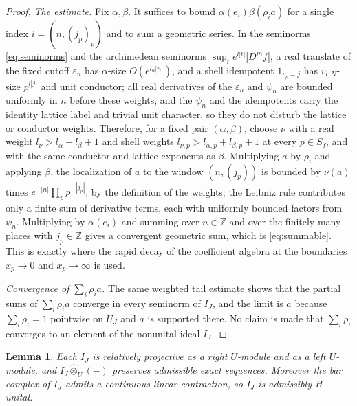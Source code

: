 \documentclass[11pt]{amsart}
\newtheorem{lemma}[theorem]{Lemma}
\theoremstyle{definition}
\theoremstyle{remark}
\newcommand{\Z}{\mathbb Z}
\begin{document}
\begin{proof}
\emph{The estimate.}  Fix $\alpha,\beta$.  It suffices to bound
$\alpha(e_i)\beta(\rho_ia)$ for a single index $i=(n,(j_p)_p)$ and to sum a
geometric series.  In the seminorms \eqref{eq:seminorms} and the archimedean
seminorms $\sup_te^{l|t|}|D^{m}f|$, a real translate of the fixed cutoff
$\varepsilon_n$ has $\alpha$-size $O(e^{l_{\alpha}|n|})$, and a shell
idempotent $1_{v_p=j}$ has $v_{l,N}$-size $p^{l|j|}$ and unit conductor; all
real derivatives of the $\varepsilon_n$ and $\psi_n$ are bounded uniformly in
$n$ before these weights, and the $\psi_n$ and the idempotents carry the
identity lattice label and trivial unit character, so they do not disturb the
lattice or conductor weights.  Therefore, for a fixed pair $(\alpha,\beta)$,
choose $\nu$ with a real weight $l_{\nu}>l_{\alpha}+l_{\beta}+1$ and shell
weights $l_{\nu,p}>l_{\alpha,p}+l_{\beta,p}+1$ at every $p\in S_f$, and with
the same conductor and lattice exponents as $\beta$.  Multiplying $a$ by
$\rho_i$ and applying $\beta$, the localization of $a$ to the window
$(n,(j_p))$ is bounded by $\nu(a)$ times $e^{-|n|}\prod_pp^{-|j_p|}$, by the
definition of the weights; the Leibniz rule contributes only a finite sum of
derivative terms, each with uniformly bounded factors from $\psi_n$.
Multiplying by $\alpha(e_i)$ and summing over $n\in\Z$ and over the
finitely many places with $j_p\in\Z$ gives a convergent geometric sum, which is
\eqref{eq:summable}.  This is exactly where the rapid decay of the coefficient
algebra at the boundaries $x_p\to0$ and $x_p\to\infty$ is used.

\emph{Convergence of $\sum_i\rho_ia$.}  The same weighted tail estimate shows
that the partial sums of $\sum_i\rho_ia$ converge in every seminorm of $I_J$,
and the limit is $a$ because $\sum_i\rho_i=1$ pointwise on $U_J$ and $a$ is
supported there.  No claim is made that $\sum_i\rho_i$ converges to an element
of the nonunital ideal $I_J$.
\end{proof}

\begin{lemma}\label{lem:projective}
Each $I_J$ is relatively projective as a right $U$-module and as a left
$U$-module, and $I_J\widehat\otimes_U(-)$ preserves admissible exact sequences.
Moreover the bar complex of $I_J$ admits a continuous linear contraction, so
$I_J$ is admissibly H-unital.
\end{lemma}
\end{document}
